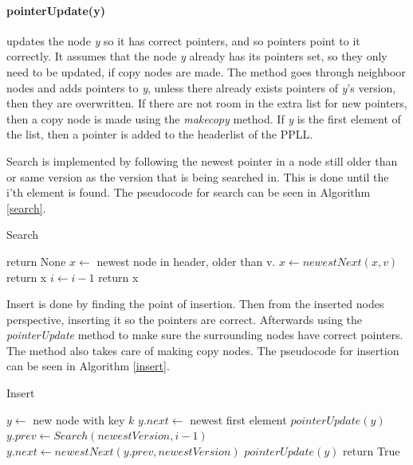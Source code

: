 \documentclass[12pt, a4paper]{article}
\begin{document}
\paragraph{pointerUpdate(y)} updates the node {\it y} so it has correct pointers, 
and so pointers point to it correctly. It assumes that the node {\it y} already
has its pointers set, so they only need to be updated, if copy nodes are made.
The method goes through neighboor nodes and adds pointers to {\it y}, unless
there already exists pointers of {\it y}'s version, then they are overwritten.
If there are not room in the extra list for new pointers, then a copy node is 
made using the {\it makecopy} method. If {\it y} is the first element of the 
list, then a pointer is added to the headerlist of the PPLL.

\medskip
Search is implemented by following the newest pointer in a node still older 
than or same version as the version that is being searched in. This is done until 
the i'th element is found. The pseudocode for search can be seen in Algorithm \ref{search}.

\begin{algorithm}
\caption{Search}\label{search}
\begin{algorithmic}[1]
        \State return None
    \EndIf
    \State $x \gets $ newest node in header, older than v. 
        \State $x \gets newestNext(x,v)$
            \State return x
        \EndIf
        \State $i \gets i-1$
    \EndWhile
    \State return x
\EndProcedure
\end{algorithmic}
\end{algorithm}

\medskip
Insert is done by finding the point of insertion. Then from the inserted 
nodes perspective, inserting it so the pointers are correct. Afterwards 
using the {\it pointerUpdate} method to make sure the surrounding nodes have 
correct pointers. The method also takes care of making copy nodes. The 
pseudocode for insertion can be seen in Algorithm \ref{insert}.

\begin{algorithm}
\caption{Insert}\label{insert}
\begin{algorithmic}[1]
    \State $y \gets$ new node with key $k$
        \State $y.next \gets$ newest first element
        \State $pointerUpdate(y)$
    \Else
        \State $y.prev \gets Search(newestVersion, i-1)$
        \State $y.next \gets newestNext(y.prev, newestVersion)$
        \State $pointerUpdate(y)$
    \EndIf
    \State return True
\EndProcedure
\end{algorithmic}
\end{algorithm}
\end{document}
